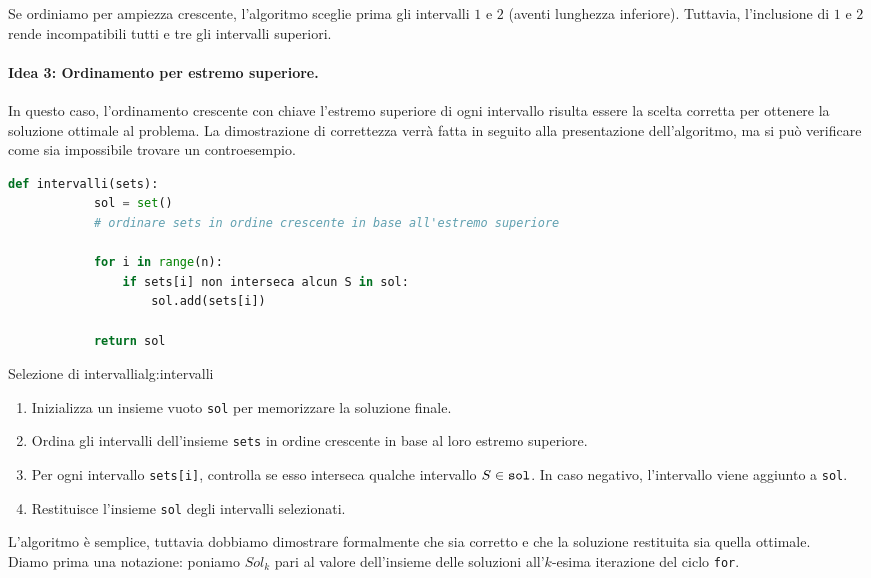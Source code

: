 \documentclass[12pt]{report}
\begin{document}
	Se ordiniamo per ampiezza crescente, l'algoritmo sceglie prima gli intervalli $1$ e $2$ (aventi lunghezza inferiore). Tuttavia, l'inclusione di $1$ e $2$ rende incompatibili tutti e tre gli intervalli superiori.
	
	\paragraph{Idea 3: Ordinamento per estremo superiore.} In questo caso, l'ordinamento crescente con chiave l'estremo superiore di ogni intervallo risulta essere la scelta corretta per ottenere la soluzione ottimale al problema. La dimostrazione di correttezza verrà fatta in seguito alla presentazione dell'algoritmo, ma si può verificare come sia impossibile trovare un controesempio.
	
	\begin{lstlisting}[style=stile-listings, language=Python, caption={Algoritmo Greedy per la selezione di intervalli}]
		def intervalli(sets):
			sol = set()
			# ordinare sets in ordine crescente in base all'estremo superiore
			
			for i in range(n):
				if sets[i] non interseca alcun S in sol:
					sol.add(sets[i])
			
			return sol
	\end{lstlisting}
	
	\begin{algoritmo}{Selezione di intervalli}{alg:intervalli}
		\begin{enumerate}
			\item Inizializza un insieme vuoto \texttt{sol} per memorizzare la soluzione finale.
			\item Ordina gli intervalli dell'insieme \texttt{sets} in ordine crescente in base al loro estremo superiore.
			\item Per ogni intervallo \texttt{sets[i]}, controlla se esso interseca qualche intervallo $S \in \text{\texttt{sol}}$. In caso negativo, l'intervallo viene aggiunto a \texttt{sol}.
			\item Restituisce l'insieme \texttt{sol} degli intervalli selezionati.
		\end{enumerate}
	\end{algoritmo}
	
	L'algoritmo è semplice, tuttavia dobbiamo dimostrare formalmente che sia corretto e che la soluzione restituita sia quella ottimale.\\
	Diamo prima una notazione: poniamo $Sol_k$ pari al valore dell'insieme delle soluzioni all'$k$-esima iterazione del ciclo \texttt{for}.
	
\end{document}
